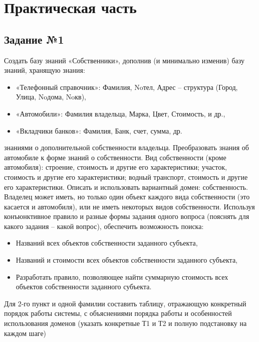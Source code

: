 \setcounter{page}{3}

\chapter{Практическая часть}
\section{Задание №1}
Создать базу знаний «Собственники», дополнив (и минимально изменив) базу
знаний, хранящую знания:
\begin{itemize}
	\item «Телефонный справочник»: Фамилия, Noтел, Адрес – структура (Город, Улица, Noдома, Noкв),
	\item «Автомобили»: Фамилия владельца, Марка, Цвет, Стоимость, и др.,
	\item «Вкладчики банков»: Фамилия, Банк, счет, сумма, др.
\end{itemize}
знаниями о дополнительной собственности владельца. Преобразовать знания об автомобиле к форме знаний о собственности.
Вид собственности (кроме автомобиля): строение, стоимость и другие его характеристики; участок, стоимость и другие его характеристики; водный транспорт, стоимость и другие его характеристики.
Описать и использовать вариантный домен: собственность. Владелец может иметь, но только один объект каждого вида собственности (это касается и автомобиля), или не иметь некоторых видов собственности.
Используя конъюнктивное правило и разные формы задания одного вопроса (пояснять для какого задания – какой вопрос), обеспечить возможность поиска:
\begin{itemize}
	\item Названий всех объектов собственности заданного субъекта,
	\item Названий и стоимости всех объектов собственности заданного субъекта,
	\item Разработать правило, позволяющее найти суммарную стоимость всех объектов собственности заданного субъекта.
\end{itemize}

Для 2-го пункт и одной фамилии составить таблицу, отражающую конкретный порядок работы системы, с объяснениями порядка работы и особенностей использования доменов (указать конкретные Т1 и Т2 и полную подстановку на каждом шаге)
  
